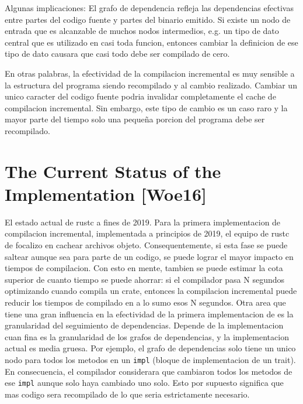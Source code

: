 \documentclass[12pt, a4paper]{report}
\begin{document}
Algunas implicaciones:
El grafo de dependencia refleja las dependencias efectivas entre partes del codigo fuente y partes del binario emitido.
Si existe un nodo de entrada que es alcanzable de muchos nodos intermedios, e.g. un tipo de dato central que es utilizado en casi toda funcion, entonces cambiar la definicion de ese tipo de dato causara que casi todo debe ser compilado de cero.

En otras palabras, la efectividad de la compilacion incremental es muy sensible a la estructura del programa siendo recompilado y al cambio realizado.
Cambiar un unico caracter del codigo fuente podria invalidar completamente el cache de compilacion incremental.
Sin embargo, este tipo de cambio es un caso raro y la mayor parte del tiempo solo una pequeña porcion del programa debe ser recompilado.
\cite{rust_blog_incremental_compilation}

\section*{The Current Status of the Implementation [Woe16]}

El estado actual de rustc a fines de 2019.
Para la primera implementacion de compilacion incremental, implementada a principios de 2019, el equipo de rustc de focalizo en cachear archivos objeto.
Consequentemente, si esta fase se puede saltear aunque sea para parte de un codigo, se puede lograr el mayor impacto en tiempos de compilacion.
Con esto en mente, tambien se puede estimar la cota superior de cuanto tiempo se puede ahorrar: si el compilador pasa N segundos optimizando cuando compila un crate, entonces la compilacion incremental puede reducir los tiempos de compilado en a lo sumo esos N segundos.
Otra area que tiene una gran influencia en la efectividad de la primera implementacion de es la granularidad del seguimiento de dependencias.
Depende de la implementacion cuan fina es la granularidad de los grafos de dependencias, y la implementacion actual es media gruesa.
Por ejemplo, el grafo de dependencias solo tiene un unico nodo para todos los metodos en un \texttt{impl} (bloque de implementacion de un trait).
En consecuencia, el compilador considerara que cambiaron todos los metodos de ese \texttt{impl} aunque solo haya cambiado uno solo.
Esto por supuesto significa que mas codigo sera recompilado de lo que seria estrictamente necesario.
\cite{rust_blog_incremental_compilation}
\end{document}
